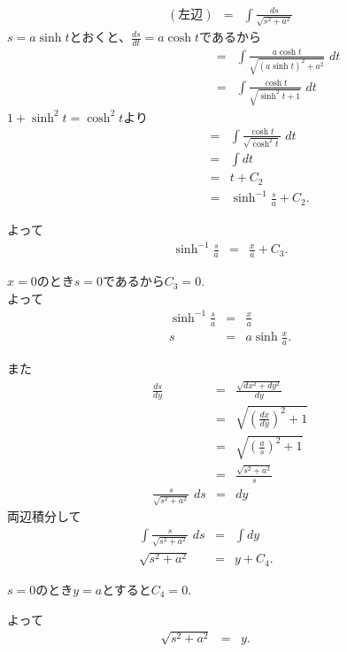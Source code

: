 \begin{eqnarray*}
(左辺) & = & \int \frac{ds}{\sqrt{s^2 + a^2}}
\end{eqnarray*}
$s = a\sinh t$とおくと、$\frac{ds}{dt} = a\cosh t$であるから
\begin{eqnarray*}
\qquad\qquad\qquad\quad & = & \int \frac{a\cosh t}{\sqrt{(a\sinh t)^2 + a^2}}\,\,dt \\
& = & \int \frac{\cosh t}{\sqrt{\sinh^2 t + 1}}\,\,dt
\end{eqnarray*}
$1 + \sinh^2 t = \cosh^2 t$より
\begin{eqnarray*}
\qquad\qquad & = & \int \frac{\cosh t}{\sqrt{\cosh^2 t}}\,\,dt \\
& = & \int dt \\
& = & t + C_2 \\
& = & \sinh^{-1}\frac{s}{a} +C_2.
\end{eqnarray*}

よって
\begin{eqnarray*}
\sinh^{-1}\frac{s}{a} & = & \frac{x}{a} + C_3.
\end{eqnarray*}

$x = 0$のとき$s = 0$であるから$C_3 = 0$. \\

よって
\begin{eqnarray*}
\sinh^{-1}\frac{s}{a} & = & \frac{x}{a} \\
s & = & a\sinh\frac{x}{a}.
\end{eqnarray*}

また
\begin{eqnarray*}
\frac{ds}{dy} & = & \frac{\sqrt{dx^2 + dy^2}}{dy} \\
& = & \sqrt{\left(\frac{dx}{dy}\right)^2 + 1} \\
& = & \sqrt{\left(\frac{a}{s}\right)^2 + 1} \\
& = & \frac{\sqrt{s^2 + a^2}}{s} \\
\frac{s}{\sqrt{s^2 + a^2}}\,\,ds & = & dy
\end{eqnarray*}
両辺積分して
\begin{eqnarray*}
\int \frac{s}{\sqrt{s^2 + a^2}}\,\,ds & = & \int dy\qquad\qquad\quad \\
\sqrt{s^2 + a^2} & = & y + C_4.
\end{eqnarray*}

$s = 0$のとき$y = a$とすると$C_4 = 0$.

よって
\begin{eqnarray*}
\sqrt{s^2 + a^2} & = & y.\qquad\quad\quad
\end{eqnarray*}


